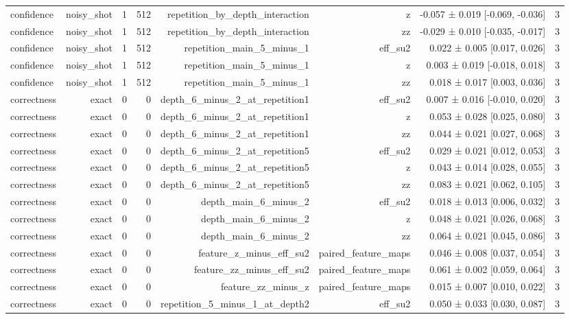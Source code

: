 \begin{table}
\begin{tabular}{lrrrrrrr}
confidence & noisy\_shot & 1 & 512 & repetition\_by\_depth\_interaction & z & -0.057 ± 0.019 [-0.069, -0.036] & 3 \\
confidence & noisy\_shot & 1 & 512 & repetition\_by\_depth\_interaction & zz & -0.029 ± 0.010 [-0.035, -0.017] & 3 \\
confidence & noisy\_shot & 1 & 512 & repetition\_main\_5\_minus\_1 & eff\_su2 & 0.022 ± 0.005 [0.017, 0.026] & 3 \\
confidence & noisy\_shot & 1 & 512 & repetition\_main\_5\_minus\_1 & z & 0.003 ± 0.019 [-0.018, 0.018] & 3 \\
confidence & noisy\_shot & 1 & 512 & repetition\_main\_5\_minus\_1 & zz & 0.018 ± 0.017 [0.003, 0.036] & 3 \\
correctness & exact & 0 & 0 & depth\_6\_minus\_2\_at\_repetition1 & eff\_su2 & 0.007 ± 0.016 [-0.010, 0.020] & 3 \\
correctness & exact & 0 & 0 & depth\_6\_minus\_2\_at\_repetition1 & z & 0.053 ± 0.028 [0.025, 0.080] & 3 \\
correctness & exact & 0 & 0 & depth\_6\_minus\_2\_at\_repetition1 & zz & 0.044 ± 0.021 [0.027, 0.068] & 3 \\
correctness & exact & 0 & 0 & depth\_6\_minus\_2\_at\_repetition5 & eff\_su2 & 0.029 ± 0.021 [0.012, 0.053] & 3 \\
correctness & exact & 0 & 0 & depth\_6\_minus\_2\_at\_repetition5 & z & 0.043 ± 0.014 [0.028, 0.055] & 3 \\
correctness & exact & 0 & 0 & depth\_6\_minus\_2\_at\_repetition5 & zz & 0.083 ± 0.021 [0.062, 0.105] & 3 \\
correctness & exact & 0 & 0 & depth\_main\_6\_minus\_2 & eff\_su2 & 0.018 ± 0.013 [0.006, 0.032] & 3 \\
correctness & exact & 0 & 0 & depth\_main\_6\_minus\_2 & z & 0.048 ± 0.021 [0.026, 0.068] & 3 \\
correctness & exact & 0 & 0 & depth\_main\_6\_minus\_2 & zz & 0.064 ± 0.021 [0.045, 0.086] & 3 \\
correctness & exact & 0 & 0 & feature\_z\_minus\_eff\_su2 & paired\_feature\_maps & 0.046 ± 0.008 [0.037, 0.054] & 3 \\
correctness & exact & 0 & 0 & feature\_zz\_minus\_eff\_su2 & paired\_feature\_maps & 0.061 ± 0.002 [0.059, 0.064] & 3 \\
correctness & exact & 0 & 0 & feature\_zz\_minus\_z & paired\_feature\_maps & 0.015 ± 0.007 [0.010, 0.022] & 3 \\
correctness & exact & 0 & 0 & repetition\_5\_minus\_1\_at\_depth2 & eff\_su2 & 0.050 ± 0.033 [0.030, 0.087] & 3 \\

\end{tabular}
\end{table}
